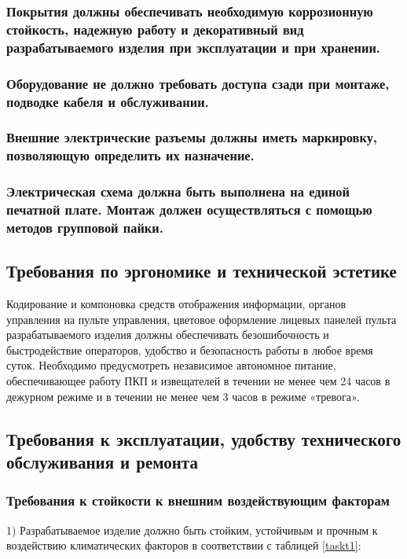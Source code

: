 					\subsubsection{Покрытия должны обеспечивать необходимую коррозионную стойкость, надежную работу и декоративный вид разрабатываемого изделия при эксплуатации и при хранении.}
					\subsubsection{Оборудование не должно требовать доступа сзади при монтаже, подводке кабеля и обслуживании.}
					\subsubsection{Внешние электрические разъемы должны иметь маркировку, позволяющую определить их назначение.}
					\subsubsection{Электрическая схема должна быть выполнена на единой печатной плате. Монтаж должен осуществляться с помощью методов групповой пайки.}
		\subsection{Требования по эргономике и технической эстетике}
			Кодирование и компоновка средств отображения информации, органов управления на пульте управления, цветовое оформление лицевых панелей пульта разрабатываемого изделия должны обеспечивать безошибочность и быстродействие операторов, удобство и безопасность работы в любое время суток.  Необходимо предусмотреть независимое автономное питание, обеспечивающее работу ПКП и извещателей в течении не менее чем 24 часов в дежурном режиме и в течении не менее чем 3 часов в режиме «тревога».
		\subsection{Требования к эксплуатации, удобству технического обслуживания и ремонта}
			\subsubsection{Требования к стойкости к внешним воздействующим факторам}
				1) Разрабатываемое изделие должно быть стойким, устойчивым и прочным к воздействию климатических факторов в соответствии с таблицей \ref{taskt1}:
				

